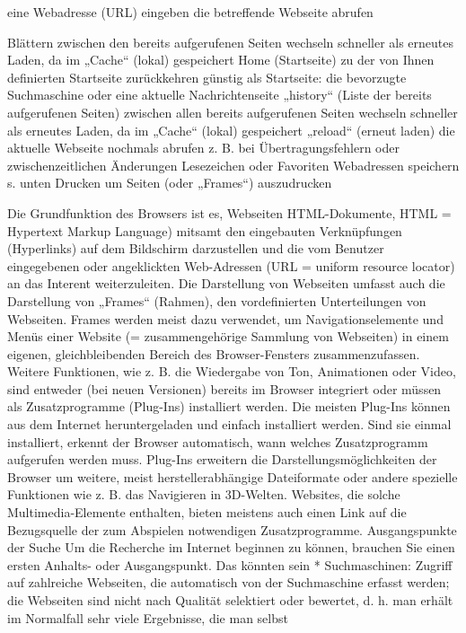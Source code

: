 \documentclass[]{book}
\theoremstyle{definition}
\theoremstyle{definition}
\theoremstyle{definition}
\theoremstyle{remark}
\begin{document}
eine Webadresse (URL) eingeben die betreffende Webseite abrufen

Blättern zwischen den bereits aufgerufenen Seiten wechseln schneller als
erneutes Laden, da im „Cache`` (lokal) gespeichert Home (Startseite) zu
der von Ihnen definierten Startseite zurückkehren günstig als
Startseite: die bevorzugte Suchmaschine oder eine aktuelle
Nachrichtenseite „history`` (Liste der bereits aufgerufenen Seiten)
zwischen allen bereits aufgerufenen Seiten wechseln schneller als
erneutes Laden, da im „Cache`` (lokal) gespeichert „reload`` (erneut
laden) die aktuelle Webseite nochmals abrufen z. B. bei
Übertragungsfehlern oder zwischenzeitlichen Änderungen Lesezeichen oder
Favoriten Webadressen speichern s. unten Drucken um Seiten (oder
„Frames``) auszudrucken

Die Grundfunktion des Browsers ist es, Webseiten HTML-Dokumente, HTML =
Hypertext Markup Language) mitsamt den eingebauten Verknüpfungen
(Hyperlinks) auf dem Bildschirm darzustellen und die vom Benutzer
eingegebenen oder angeklickten Web-Adressen (URL = uniform resource
locator) an das Interent weiterzuleiten. Die Darstellung von Webseiten
umfasst auch die Darstellung von „Frames`` (Rahmen), den vordefinierten
Unterteilungen von Webseiten. Frames werden meist dazu verwendet, um
Navigationselemente und Menüs einer Website (= zusammengehörige Sammlung
von Webseiten) in einem eigenen, gleichbleibenden Bereich des
Browser-Fensters zusammenzufassen. Weitere Funktionen, wie z. B. die
Wiedergabe von Ton, Animationen oder Video, sind entweder (bei neuen
Versionen) bereits im Browser integriert oder müssen als Zusatzprogramme
(Plug-Ins) installiert werden. Die meisten Plug-Ins können aus dem
Internet heruntergeladen und einfach installiert werden. Sind sie einmal
installiert, erkennt der Browser automatisch, wann welches
Zusatzprogramm aufgerufen werden muss. Plug-Ins erweitern die
Darstellungsmöglichkeiten der Browser um weitere, meist
herstellerabhängige Dateiformate oder andere spezielle Funktionen wie z.
B. das Navigieren in 3D-Welten. Websites, die solche Multimedia-Elemente
enthalten, bieten meistens auch einen Link auf die Bezugsquelle der zum
Abspielen notwendigen Zusatzprogramme. Ausgangspunkte der Suche Um die
Recherche im Internet beginnen zu können, brauchen Sie einen ersten
Anhalts- oder Ausgangspunkt. Das könnten sein * Suchmaschinen: Zugriff
auf zahlreiche Webseiten, die automatisch von der Suchmaschine erfasst
werden; die Webseiten sind nicht nach Qualität selektiert oder bewertet,
d. h. man erhält im Normalfall sehr viele Ergebnisse, die man selbst
\end{document}
